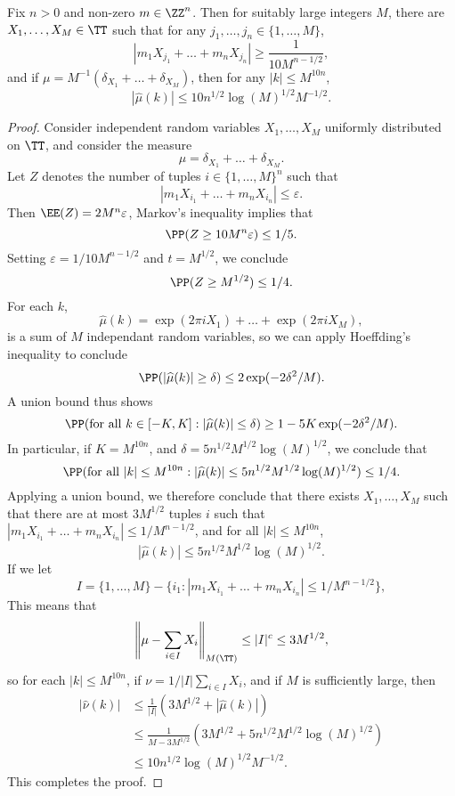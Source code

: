 \begin{theorem}
	Fix $n > 0$ and non-zero $m \in \ZZ^n$. Then for suitably large integers $M$, there are $X_1, \dots, X_M \in \TT$ such that for any $j_1, \dots, j_n \in \{ 1, \dots, M \}$,
	\[ |m_1X_{j_1} + \dots + m_n X_{j_n} | \geq \frac{1}{10 M^{n-1/2}}, \]
	and if $\mu = M^{-1}(\delta_{X_1} + \dots + \delta_{X_M})$, then for any $|k| \leq M^{10n}$,
	\[ |\widehat{\mu}(k)| \leq 10 n^{1/2} \log(M)^{1/2} M^{-1/2}. \]
\end{theorem}
\begin{proof}
	Consider independent random variables $X_1, \dots, X_M$ uniformly distributed on $\TT$, and consider the measure
	\[ \mu = \delta_{X_1} + \dots + \delta_{X_M}. \]
	Let $Z$ denotes the number of tuples $i \in \{ 1, \dots, M \}^n$ such that
	\[ |m_1 X_{i_1} + \dots + m_n X_{i_n}| \leq \varepsilon. \]
	Then $\EE(Z) = 2 M^n \varepsilon$, Markov's inequality implies that
	\[ \PP(Z \geq 10M^n \varepsilon) \leq 1/5. \]
	Setting $\varepsilon = 1/10M^{n-1/2}$ and $t = M^{1/2}$, we conclude
	\[ \PP(Z \geq M^{1/2}) \leq 1/4. \]
	For each $k$,
	\[ \widehat{\mu}(k) = \exp(2 \pi i X_1) + \dots + \exp(2 \pi i X_M), \]
	is a sum of $M$ independant random variables, so we can apply Hoeffding's inequality to conclude
	\[ \PP(|\widehat{\mu}(k)| \geq \delta) \leq 2 \exp(-2 \delta^2 / M). \]
	A union bound thus shows
	\[ \PP(\text{for all}\ k \in [-K,K] : |\widehat{\mu}(k)| \leq \delta) \geq 1 - 5K \exp(-2 \delta^2 / M). \]
	In particular, if $K = M^{10n}$, and $\delta = 5 n^{1/2} M^{1/2} \log(M)^{1/2}$, we conclude that
	\[ \PP(\text{for all}\ |k| \leq M^{10n} : |\widehat{\mu}(k)| \leq 5n^{1/2} M^{1/2} \log(M)^{1/2} ) \leq 1/4. \]
	Applying a union bound, we therefore conclude that there exists $X_1, \dots, X_M$ such that there are at most $3M^{1/2}$ tuples $i$ such that $|m_1 X_{i_1} + \dots + m_n X_{i_n}| \leq 1/M^{n-1/2}$, and for all $|k| \leq M^{10n}$,
	\[ |\widehat{\mu}(k)| \leq 5n^{1/2} M^{1/2} \log(M)^{1/2}. \]
	If we let
	\[ I = \{ 1, \dots, M \} - \{ i_1 : |m_1 X_{i_1} + \dots + m_n X_{i_n}| \leq 1/M^{n-1/2} \}, \]
	This means that
	\[ \left\| \mu - \sum_{i \in I} X_i \right\|_{M(\TT)} \leq |I|^c \leq 3M^{1/2}, \]
	so for each $|k| \leq M^{10n}$, if $\nu = 1/|I| \sum_{i \in I} X_i$, and if $M$ is sufficiently large, then
	\begin{align*}
		|\widehat{\nu}(k)| &\leq \frac{1}{|I|} \left( 3M^{1/2} + |\widehat{\mu}(k)| \right)\\
		&\leq \frac{1}{M - 3M^{1/2}} \left( 3M^{1/2} + 5n^{1/2} M^{1/2} \log(M)^{1/2} \right)\\
		&\leq 10 n^{1/2} \log(M)^{1/2} M^{-1/2}.
	\end{align*}
	This completes the proof.
\end{proof}

